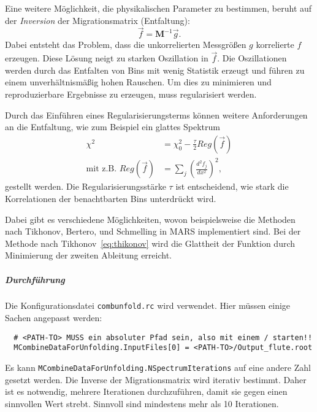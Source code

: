 Eine weitere Möglichkeit, die physikalischen Parameter zu bestimmen,
beruht auf der \textit{Inversion} der Migrationsmatrix (Entfaltung):
\begin{equation}
    \vec{f} = \mathbf{M}^{-1} \vec{g}.
\end{equation}
Dabei entsteht das Problem, dass die unkorrelierten Messgrößen $g$
korrelierte $f$ erzeugen.
Diese
Lösung
neigt
zu starken Oszillation in $\vec{f}$.
Die Oszillationen werden durch das Entfalten von Bins mit wenig Statistik
erzeugt und führen
zu einem unverhältnismäßig hohen Rauschen.
Um dies zu minimieren und reproduzierbare Ergebnisse zu erzeugen,
muss regularisiert werden.


Durch das Einführen eines Regularisierungsterms können weitere Anforderungen an die
Entfaltung, wie zum Beispiel ein glattes Spektrum
\begin{align}
    \chi^2 &= \chi^2_0 - \frac{\tau}{2} Reg(\vec{f}) \\
    \text{mit z.B. } Reg(\vec{f}) &= \sum_j {\left( \frac{d^2 f_j}{dx^2}
    \right)}^2,
    \label{eq:thikonov}
\end{align}
gestellt werden.
Die Regularisierungsstärke $\tau$ ist entscheidend, wie stark die Korrelationen
der benachtbarten Bins unterdrückt wird. 

Dabei gibt es verschiedene Möglichkeiten,
wovon beispielsweise die Methoden nach
Tikhonov, Bertero, und Schmelling
in MARS implementiert sind.
Bei der Methode nach Tikhonov~\eqref{eq:thikonov} wird die Glattheit der
Funktion durch Minimierung der zweiten Ableitung erreicht.

\subparagraph{Durchführung}%

Die Konfigurationsdatei \texttt{combunfold.rc} wird verwendet.
Hier müssen einige Sachen angepasst werden:
\begin{lstlisting}
  # <PATH-TO> MUSS ein absoluter Pfad sein, also mit einem / starten!!
  MCombineDataForUnfolding.InputFiles[0] = <PATH-TO>/Output_flute.root
\end{lstlisting}
Es kann
\texttt{MCombineDataForUnfolding.NSpectrumIterations}
auf eine andere Zahl gesetzt werden.
Die Inverse der Migrationsmatrix wird iterativ bestimmt.
Daher ist es notwendig, mehrere
Iterationen durchzuführen, damit sie gegen einen sinnvollen Wert strebt.
Sinnvoll sind mindestens mehr als 10 Iterationen.

